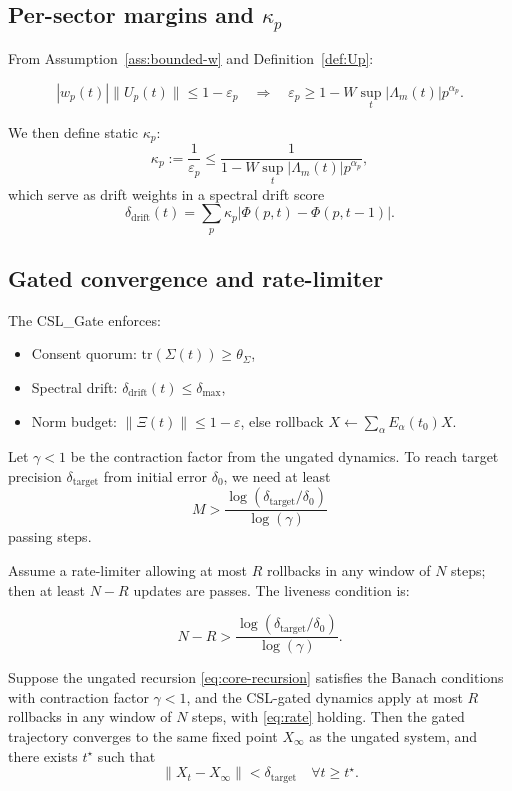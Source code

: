 \documentclass[11pt]{article}
\begin{document}
\subsection{Per-sector margins and $\kappa_p$}

From Assumption~\ref{ass:bounded-w} and Definition~\ref{def:Up}:

\[
|w_p(t)| \|U_p(t)\| \le 1 - \varepsilon_p
\quad\Rightarrow\quad
\varepsilon_p \ge 1 - W \sup_t|\Lambda_m(t)| p^{\alpha_p}.
\]

We then define static $\kappa_p$:
\[
\kappa_p := \frac{1}{\varepsilon_p}
\le \frac{1}{1 - W \sup_t|\Lambda_m(t)| p^{\alpha_p}},
\]
which serve as drift weights in a spectral drift score
\[
\delta_{\mathrm{drift}}(t) = \sum_p \kappa_p |\Phi(p,t) - \Phi(p,t-1)|.
\]

\subsection{Gated convergence and rate-limiter}

The CSL\_Gate enforces:

\begin{itemize}
    \item Consent quorum: $\mathrm{tr}(\Sigma(t)) \ge \theta_\Sigma$,
    \item Spectral drift: $\delta_{\mathrm{drift}}(t) \le \delta_{\max}$,
    \item Norm budget: $\|\Xi(t)\| \le 1 - \varepsilon$, else rollback
    $X \leftarrow \sum_\alpha E_\alpha(t_0) X$.
\end{itemize}

Let $\gamma < 1$ be the contraction factor from the ungated dynamics. To reach
target precision $\delta_{\mathrm{target}}$ from initial error $\delta_0$, we
need at least
\[
M > \frac{\log(\delta_{\mathrm{target}}/\delta_0)}{\log(\gamma)}
\]
passing steps.

Assume a rate-limiter allowing at most $R$ rollbacks in any window of $N$ steps;
then at least $N-R$ updates are passes. The liveness condition is:

\begin{equation}\label{eq:rate}
N - R > \frac{\log(\delta_{\mathrm{target}}/\delta_0)}{\log(\gamma)}.
\end{equation}

\begin{theorem}\label{thm:gated}
Suppose the ungated recursion \eqref{eq:core-recursion} satisfies the Banach
conditions with contraction factor $\gamma<1$, and the CSL-gated dynamics
apply at most $R$ rollbacks in any window of $N$ steps, with \eqref{eq:rate}
holding. Then the gated trajectory converges to the same fixed point
$X_\infty$ as the ungated system, and there exists $t^\star$ such that
\[
\|X_t - X_\infty\| < \delta_{\mathrm{target}} \quad \forall t \ge t^\star.
\]
\end{theorem}
\end{document}

